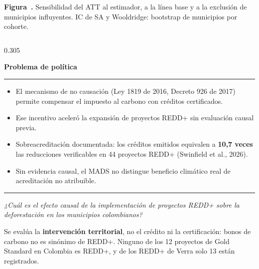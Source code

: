 \documentclass[final,t]{beamer}
\newcommand{\seccion}[2]{%
  \par\vspace{0.5\baselineskip}%
  {\color{dosel}\Large\bfseries #1\hfill{\color{tenue}\normalsize\mdseries #2}}\par
  \vspace{-0.35\baselineskip}%
  {\color{dosel}\rule{\linewidth}{2.2pt}}\par
  \vspace{0.25\baselineskip}%
}
\newcommand{\nota}[1]{{\color{tenue}\small #1\par}}
\newcounter{figposter}
\begin{document}
\begin{frame}[t]{}
\begin{tcolorbox}[colback=tinta,colframe=tinta,boxrule=0pt,sharp corners,
  left=0.999cm,right=0.999cm,top=0.749cm,bottom=0.749cm]
\begin{minipage}[c]{0.60\linewidth}
\vspace{0.25cm}
\label{fig:franja}%
{\color{papel!60}\small\textbf{Figura~\thefigposter.} Sensibilidad del ATT al estimador, a la línea base y a la
exclusión de municipios influyentes. IC de SA y Wooldridge: bootstrap de municipios por cohorte.\par}
\end{minipage}
\end{tcolorbox}



\begin{columns}[t]

\begin{column}{0.305\paperwidth}
\justifying

\seccion{Problema de política}{}
\begin{itemize}
  \item El mecanismo de no causación (Ley 1819 de 2016, Decreto 926 de 2017) permite compensar
        el impuesto al carbono con créditos certificados.
  \item Ese incentivo aceleró la expansión de proyectos REDD+ sin evaluación causal previa.
  \item[\textcolor{brasa}{\rule{0.45ex}{0.45ex}}] Sobreacreditación documentada: los créditos emitidos
        equivalen a \textbf{10,7 veces} las reducciones verificables en 44 proyectos REDD+
        (Swinfield et al., 2026).
  \item Sin evidencia causal, el MADS no distingue beneficio climático real de acreditación
        no atribuible.
\end{itemize}

\vspace{0.25cm}
{\color{amazonia}\rule{3pt}{2.164cm}}\hspace{0.333cm}%
\begin{minipage}[b]{0.88\linewidth}
  {\color{dosel}\fontsize{25}{30}\selectfont\itshape
   ¿Cuál es el efecto causal de la implementación de proyectos REDD+ sobre la
   deforestación en los municipios colombianos?}
\end{minipage}

\vspace{0.28cm}
\nota{Se evalúa la \textbf{intervención territorial}, no el crédito ni la certificación: bonos de
carbono no es sinónimo de REDD+. Ninguno de los 12 proyectos de Gold Standard en Colombia es
REDD+, y de los REDD+ de Verra solo 13 están registrados.}


\end{column}
\end{columns}
\end{frame}
\end{document}
